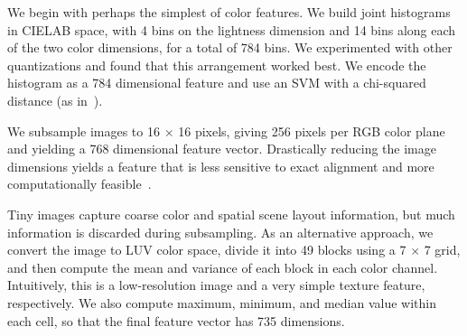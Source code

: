 \documentclass[10pt,journal,compsoc]{IEEEtran}
\begin{document}
 We begin with perhaps the simplest of color
features. We build joint histograms in CIELAB space, with 4 bins on
the lightness dimension and 14 bins along each of the two color
dimensions, for a total of 784 bins. We experimented with other
quantizations and found that this arrangement worked best.  We encode
the histogram as a 784 dimensional feature and use an SVM with a
chi-squared distance (as in~\cite{XiaoHEOT10}).

We subsample images to 16 $\times$ 16 pixels, giving 256 pixels per
RGB color plane and yielding a 768 dimensional feature vector.
Drastically reducing the image dimensions yields a feature that is
less sensitive to exact alignment and more computationally
feasible~\cite{torralba2008tiny}.  


 Tiny images capture coarse color and spatial
scene layout information, but much information is discarded during
subsampling.  As an alternative approach, we convert the image to LUV
color space, divide it into 49 blocks using a 7 $\times$ 7 grid, and
then compute the mean and variance of each block in each color
channel.  Intuitively, this is a low-resolution image and a very
simple texture feature, respectively.  We also compute maximum,
minimum, and median value within each cell, so that the final
feature vector has 735 dimensions.


\end{document}
